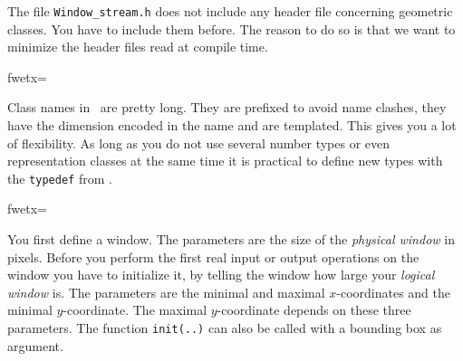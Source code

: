 \documentclass[]{article}
\begin{document}
The file {\tt Window\_stream.h} does not include any header file
concerning geometric classes. You have to include them before.
The reason to do so is that we want to minimize the header files
read at compile time.

\fwbeginmacro
{}\fwequals \fwodef {}fwetx=%
\fwcdef 
\fwbeginmacronotes
{}
\fwendmacronotes
\fwendmacro



Class names in \cgal\ are pretty long. They are prefixed to avoid
name clashes, they have the dimension encoded in the name and are
templated. This gives you a lot of flexibility. As long as you do not
use several number types or even representation classes at the same time
it is practical to define new types with the {\tt typedef} from \CC.

\fwbeginmacro
{}\fwequals \fwodef {}fwetx=%
\fwcdef 
\fwbeginmacronotes
{}
\fwendmacronotes
\fwendmacro




You first define a window. The parameters are the size of the
{\em physical window} in pixels. Before you perform the first real input
or output operations on the window you have to initialize it, by telling
the window how large your {\em logical window} is. The parameters are
the minimal and maximal $x$-coordinates and the minimal $y$-coordinate.
The maximal $y$-coordinate depends on these three parameters. The function
{\tt init(..)} can also be called with a bounding box as argument.
\end{document}
